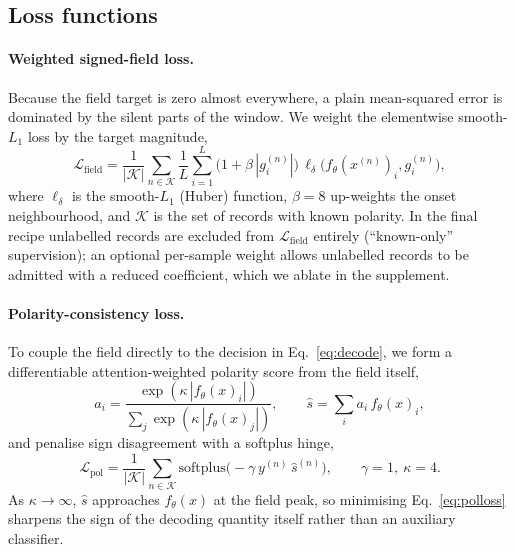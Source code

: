 \documentclass[11pt]{article}
\begin{document}
\subsection{Loss functions}
\label{sec:losses}

\paragraph{Weighted signed-field loss.}
Because the field target is zero almost everywhere, a plain mean-squared error
is dominated by the silent parts of the window. We weight the elementwise
smooth-$L_1$ loss by the target magnitude,
\begin{equation}
  \mathcal{L}_\mathrm{field}
  = \frac{1}{|\mathcal{K}|}\sum_{n\in\mathcal{K}}
    \frac{1}{L}\sum_{i=1}^{L}
      \big(1 + \beta\,|g^{(n)}_i|\big)\,
      \ell_{\delta}\!\big(f_\theta(x^{(n)})_i, g^{(n)}_i\big),
  \label{eq:fieldloss}
\end{equation}
where $\ell_\delta$ is the smooth-$L_1$ (Huber) function, $\beta=8$ up-weights
the onset neighbourhood, and $\mathcal{K}$ is the set of records with known
polarity. In the final recipe unlabelled records are excluded from
$\mathcal{L}_\mathrm{field}$ entirely (``known-only'' supervision); an
optional per-sample weight allows unlabelled records to be admitted with a
reduced coefficient, which we ablate in the supplement.

\paragraph{Polarity-consistency loss.}
To couple the field directly to the decision in Eq.~\eqref{eq:decode}, we form
a differentiable attention-weighted polarity score from the field itself,
\begin{equation}
  a_i = \frac{\exp(\kappa\,|f_\theta(x)_i|)}{\sum_j \exp(\kappa\,|f_\theta(x)_j|)},
  \qquad
  \hat s = \sum_i a_i\,f_\theta(x)_i,
  \label{eq:attn}
\end{equation}
and penalise sign disagreement with a softplus hinge,
\begin{equation}
  \mathcal{L}_\mathrm{pol}
  = \frac{1}{|\mathcal{K}|}\sum_{n\in\mathcal{K}}
    \mathrm{softplus}\!\big(-\gamma\, y^{(n)}\, \hat s^{(n)}\big),
  \qquad \gamma=1,\ \kappa=4 .
  \label{eq:polloss}
\end{equation}
As $\kappa\to\infty$, $\hat s$ approaches $f_\theta(x)$ at the field peak, so
minimising Eq.~\eqref{eq:polloss} sharpens the sign of the decoding quantity
itself rather than an auxiliary classifier.
\end{document}
